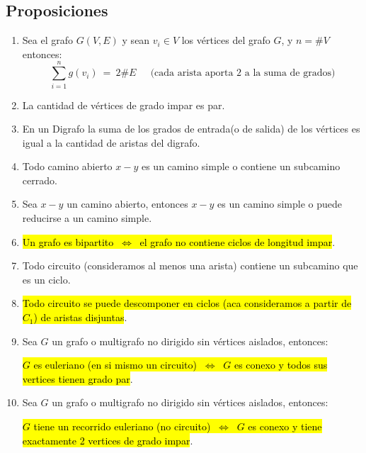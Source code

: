 \documentclass{article}
\newcommand{\eq}{\:=\:}                                 %
\newcommand{\Leftrightarrows}{\: \Leftrightarrow \:}    %
\newcommand{\sumatoria}[2]{\sum_{#1} ^{#2}}
\begin{document}
\subsection{Proposiciones}
\begin{enumerate}
    \item Sea el grafo $G(V,E)$ y sean $v_i \in V$ los vértices del grafo $G$, y $n = \#V$ entonces:
    \begin{equation*}
       \sumatoria{i=1}{n}g(v_i) \eq 2\#E \;\;\;\;\text{ (cada arista aporta 2 a la suma de grados)} 
    \end{equation*}
    \item La cantidad de vértices de grado impar es par.
    \item En un Digrafo la suma de los grados de entrada(o de salida) de los vértices es igual a la cantidad de aristas del digrafo.
    \item Todo camino abierto $x-y$ es un camino simple o contiene un subcamino cerrado.
    \item Sea $x-y$ un camino abierto, entonces $x-y$ es un camino simple o puede reducirse a un camino simple.
    \item \hl{Un grafo es bipartito $\Leftrightarrows$ el grafo no contiene ciclos de longitud impar}. 
    \item Todo circuito (consideramos al menos una arista) contiene un subcamino que es un ciclo.
    \item \hl{Todo circuito se puede descomponer en ciclos (aca consideramos a partir de $C_1$) de aristas disjuntas}.
    \item Sea $G$ un grafo o multigrafo no dirigido sin vértices aislados, entonces:
    \begin{center}
        \hl{$G$ es euleriano (en si mismo un circuito) $\Leftrightarrows$ $G$ es conexo y todos sus vertices tienen grado par}.
    \end{center}
    \item Sea $G$ un grafo o multigrafo no dirigido sin vértices aislados, entonces:
    \begin{center}
        \hl{$G$ tiene un recorrido euleriano (no circuito) $\Leftrightarrows$ $G$ es conexo y tiene exactamente 2 vertices de grado impar}.
    \end{center}
\end{enumerate}

\newpage
\end{document}
